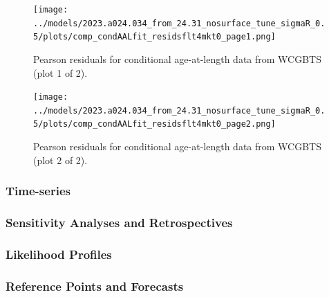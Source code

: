 \documentclass[11pt,
  english,
  letterpaper,
]{article}
\begin{document}
\begin{figure}
\centering
\texttt{[image: ../models/2023.a024.034\_from\_24.31\_nosurface\_tune\_sigmaR\_0.5/plots/comp\_condAALfit\_residsflt4mkt0\_page1.png]}
\caption{Pearson residuals for conditional age-at-length data from WCGBTS (plot 1 of 2).\label{fig:agg-caal-fit1}}
\end{figure}

\begin{figure}
\centering
\texttt{[image: ../models/2023.a024.034\_from\_24.31\_nosurface\_tune\_sigmaR\_0.5/plots/comp\_condAALfit\_residsflt4mkt0\_page2.png]}
\caption{Pearson residuals for conditional age-at-length data from WCGBTS (plot 2 of 2).\label{fig:agg-caal-fit2}}
\end{figure}

\hypertarget{time-series}{%
\subsubsection{Time-series}\label{time-series}}

\hypertarget{sensitivity-analyses-and-retrospectives}{%
\subsubsection{Sensitivity Analyses and Retrospectives}\label{sensitivity-analyses-and-retrospectives}}

\hypertarget{likelihood-profiles-1}{%
\subsubsection{Likelihood Profiles}\label{likelihood-profiles-1}}

\hypertarget{reference-points-and-forecasts}{%
\subsubsection{Reference Points and Forecasts}\label{reference-points-and-forecasts}}
\end{document}
